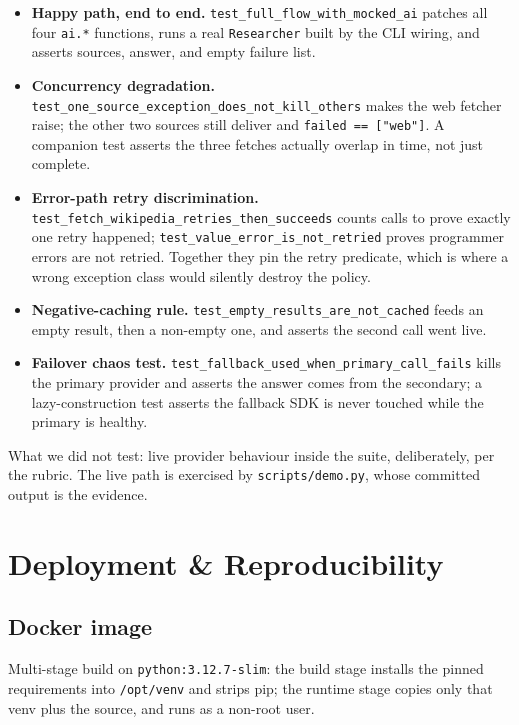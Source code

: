 \documentclass[11pt,a4paper]{article}
\begin{document}
\begin{itemize}[topsep=2pt,itemsep=1pt]
  \item \textbf{Happy path, end to end.} \texttt{test\_full\_flow\_with\_mocked\_ai} patches all four \texttt{ai.*} functions, runs a real \texttt{Researcher} built by the CLI wiring, and asserts sources, answer, and empty failure list.
  \item \textbf{Concurrency degradation.} \texttt{test\_one\_source\_exception\_does\_not\_kill\_others} makes the web fetcher raise; the other two sources still deliver and \texttt{failed == ["web"]}. A companion test asserts the three fetches actually overlap in time, not just complete.
  \item \textbf{Error-path retry discrimination.} \texttt{test\_fetch\_wikipedia\_retries\_then\_succeeds} counts calls to prove exactly one retry happened; \texttt{test\_value\_error\_is\_not\_retried} proves programmer errors are not retried. Together they pin the retry predicate, which is where a wrong exception class would silently destroy the policy.
  \item \textbf{Negative-caching rule.} \texttt{test\_empty\_results\_are\_not\_cached} feeds an empty result, then a non-empty one, and asserts the second call went live.
  \item \textbf{Failover chaos test.} \texttt{test\_fallback\_used\_when\_primary\_call\_fails} kills the primary provider and asserts the answer comes from the secondary; a lazy-construction test asserts the fallback SDK is never touched while the primary is healthy.
\end{itemize}

What we did not test: live provider behaviour inside the suite, deliberately, per the rubric. The live path is exercised by \texttt{scripts/demo.py}, whose committed output is the evidence.

\section{Deployment \& Reproducibility}\label{sec:deploy}

\subsection{Docker image}

Multi-stage build on \texttt{python:3.12.7-slim}: the build stage installs the pinned requirements into \texttt{/opt/venv} and strips pip; the runtime stage copies only that venv plus the source, and runs as a non-root user.
\end{document}
